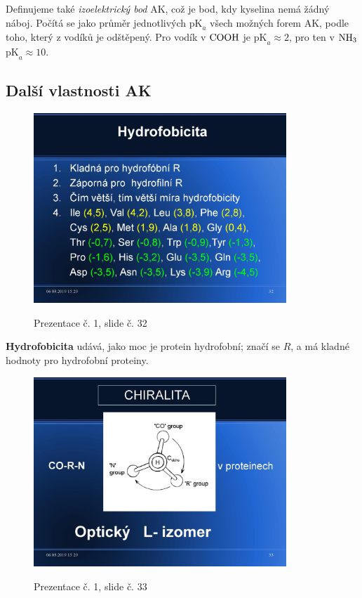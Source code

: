 \documentclass[DIV=8]{scrreprt}
\begin{document}
Definujeme také \emph{izoelektrický bod} AK, což je bod, kdy kyselina nemá žádný náboj. Počítá se jako průměr jednotlivých \(\text{pK}_a\) všech možných forem AK, podle toho, který z vodíků je odštěpený. Pro vodík v \(\ce{COOH}\) je \(\text{pK}_a \approx 2\), pro ten v \(\ce{NH3}\) \(\text{pK}_a \approx 10\).

\subsection{Další vlastnosti AK} \label{Další vlastnosti AK}


\begin{figure}
    \caption{Prezentace č. 1, slide č. 32}
    \includegraphics[width=0.85\textwidth]{slides-1/slide-32.jpg}
    \centering
    \label{slides-1-slide-32}
\end{figure}

\textbf{Hydrofobicita} udává, jako moc je protein hydrofobní; značí se \(R\), a má kladné hodnoty pro hydrofobní proteiny.

\begin{figure}
    \caption{Prezentace č. 1, slide č. 33}
    \includegraphics[width=0.85\textwidth]{slides-1/slide-33.jpg}
    \centering
    \label{slides-1-slide-33}
\end{figure}
\end{document}
